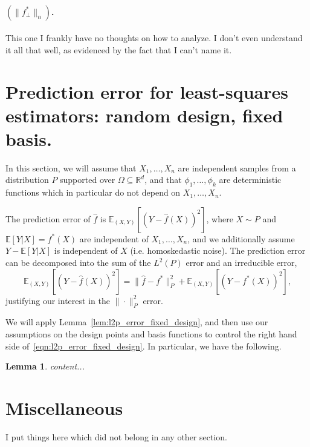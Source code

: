 \documentclass{article}
\newcommand{\Reals}{\mathbb{R}}
\newcommand{\1}{\mathbf{1}}
\newcommand{\Rd}{\Reals^d}
\newcommand{\wh}[1]{\widehat{#1}}
\newtheorem{lemma}{Lemma}
\theoremstyle{definition}
\theoremstyle{remark}
\begin{document}
\paragraph{$(\|f_{\perp}^{\ast}\|_n)$.}

This one I frankly have no thoughts on how to analyze. I don't even understand it all that well, as evidenced by the fact that I can't name it.


\clearpage

\section{Prediction error for least-squares estimators: random design, fixed basis.}
In this section, we will assume that $X_1,\ldots,X_n$ are independent samples from a distribution $P$ supported over $\Omega \subseteq \Rd$, and that $\phi_1,\ldots,\phi_k$ are deterministic functions which in particular do not depend on $X_1,\ldots,X_n$.

The prediction error of $\wh{f}$ is $\mathbb{E}_{(X,Y)}[(Y - \wh{f}(X))^2]$, where $X \sim P$ and $\mathbb{E}[Y|X] = f^{\ast}(X)$ are independent of $X_1,\ldots,X_n$, and we additionally assume $Y - \mathbb{E}[Y|X]$ is independent of $X$ (i.e. homoskedastic noise). The prediction error can be decomposed into the sum of the $L^2(P)$ error and an irreducible error,
\begin{equation}
\mathbb{E}_{(X,Y)}[(Y - \wh{f}(X))^2] = \|\wh{f} - f^{\ast}\|_P^2 + \mathbb{E}_{(X,Y)}[(Y - f^{\ast}(X))^2],
\end{equation}
justifying our interest in the $\|\cdot\|_P^2$ error.

We will apply Lemma~\ref{lem:l2p_error_fixed_design}, and then use our assumptions on the design points and basis functions to control the right hand side of~\eqref{eqn:l2p_error_fixed_design}. In particular, we have the following. 
\begin{lemma}
	content...
\end{lemma}

\section{Miscellaneous}
I put things here which did not belong in any other section.
\end{document}
